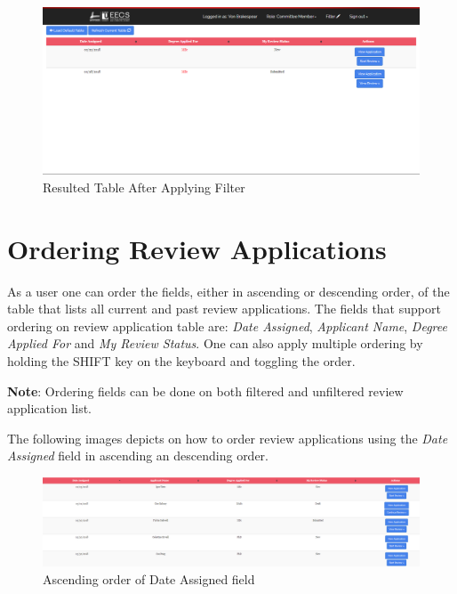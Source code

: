 \documentclass[fontsize=12pt,paper=letter,twoside]{scrartcl}
\begin{document}
\begin{figure}[!htb]
\begin{center}
\includegraphics[width=.9\textwidth]{images/example_filter_table.png}
\end{center}
\caption{Resulted Table After Applying Filter}
\label{fig:resulted_table}
\end{figure}

\clearpage
\newpage
\section{Ordering Review Applications}
As a user one can order the fields, either in ascending or descending order, of the table that lists all current and past review applications. The fields that support ordering on review application table are: \emph{Date Assigned}, \emph{Applicant Name}, \emph{Degree Applied For} and \emph{My Review Status}. One can also apply multiple ordering by holding the SHIFT key on the keyboard and toggling the order.

\bigskip
\noindent \textbf{Note}: Ordering fields can be done on both filtered and unfiltered review application list.

\bigskip
\noindent The following images depicts on how to order review applications using the \emph{Date Assigned} field in ascending an descending order.

\begin{figure}[!htb]
\begin{center}
\includegraphics[width=.9\textwidth]{images/order_ascending.png}
\end{center}
\caption{Ascending order of Date Assigned field}
\label{fig:order_ascending}
\end{figure}
\end{document}
